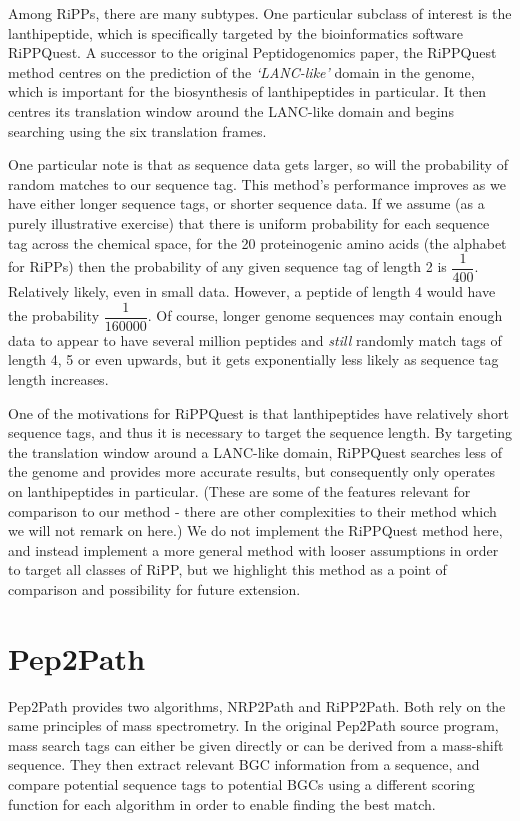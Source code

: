 \documentclass{l4proj}
\newcommand{\cit}[1]{\citep{#1}}
\begin{document}
Among RiPPs, there are many subtypes. One particular subclass of interest is the lanthipeptide, which is specifically targeted by the bioinformatics software RiPPQuest. \cit{rippq} A successor to the original Peptidogenomics paper, the RiPPQuest method centres on the prediction of the \textit{`LANC-like'} domain in the genome, which is important for the biosynthesis of lanthipeptides in particular. It then centres its translation window around the LANC-like domain and begins searching using the six translation frames. 

One particular note is that as sequence data gets larger, so will the probability of random matches to our sequence tag. This method's performance improves as we have either longer sequence tags, or shorter sequence data. If we assume (as a purely illustrative exercise) that there is uniform probability for each sequence tag across the chemical space, for the 20 proteinogenic amino acids (the alphabet for RiPPs) then the probability of any given sequence tag of length 2 is \(\dfrac{1}{400}\). Relatively likely, even in small data. However, a peptide of length 4 would have the probability \(\dfrac{1}{160000}\). Of course, longer genome sequences may contain enough data to appear to have several million peptides and \textit{still} randomly match tags of length 4, 5 or even upwards, but it gets exponentially less likely as sequence tag length increases.

One of the motivations for RiPPQuest is that lanthipeptides have relatively short sequence tags, and thus it is necessary to target the sequence length. By targeting the translation window around a LANC-like domain, RiPPQuest searches less of the genome and provides more accurate results, but consequently only operates on lanthipeptides in particular. (These are some of the features relevant for comparison to our method - there are other complexities to their method which we will not remark on here.) We do not implement the RiPPQuest method here, and instead implement a more general method with looser assumptions in order to target all classes of RiPP, but we highlight this method as a point of comparison and possibility for future extension.

\section{Pep2Path}

Pep2Path \cit{p2p} provides two algorithms, NRP2Path and RiPP2Path. Both rely on the same principles of mass spectrometry. In the original Pep2Path source program, mass search tags can either be given directly or can be derived from a mass-shift sequence. They then extract relevant BGC information from a sequence, and compare potential sequence tags to potential BGCs using a different scoring function for each algorithm in order to enable finding the best match.
\end{document}

